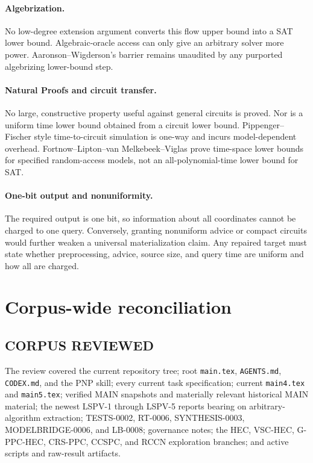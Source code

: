 \documentclass[11pt]{article}
\begin{document}
\paragraph{Algebrization.}
No low-degree extension argument converts this flow upper bound into a SAT
lower bound. Algebraic-oracle access can only give an arbitrary solver more
power. Aaronson--Wigderson's barrier remains unaudited by any purported
algebrizing lower-bound step.

\paragraph{Natural Proofs and circuit transfer.}
No large, constructive property useful against general circuits is proved.
Nor is a uniform time lower bound obtained from a circuit lower bound.
Pippenger--Fischer style time-to-circuit simulation is one-way and incurs
model-dependent overhead. Fortnow--Lipton--van Melkebeek--Viglas prove
time-space lower bounds for specified random-access models, not an
all-polynomial-time lower bound for SAT.

\paragraph{One-bit output and nonuniformity.}
The required output is one bit, so information about all coordinates cannot
be charged to one query. Conversely, granting nonuniform advice or compact
circuits would further weaken a universal materialization claim. Any repaired
target must state whether preprocessing, advice, source size, and query time
are uniform and how all are charged.

\section{Corpus-wide reconciliation}

\subsection*{CORPUS REVIEWED}
The review covered the current repository tree; root \texttt{main.tex},
\texttt{AGENTS.md}, \texttt{CODEX.md}, and the PNP skill; every current task
specification; current \texttt{main4.tex} and \texttt{main5.tex}; verified
MAIN snapshots and materially relevant historical MAIN material; the newest
LSPV-1 through LSPV-5 reports bearing on arbitrary-algorithm extraction;
TESTS-0002, RT-0006, SYNTHESIS-0003, MODELBRIDGE-0006, and LB-0008; governance
notes; the HEC, VSC-HEC, G-PPC-HEC, CRS-PPC, CCSPC, and RCCN exploration
branches; and active scripts and raw-result artifacts.
\end{document}
